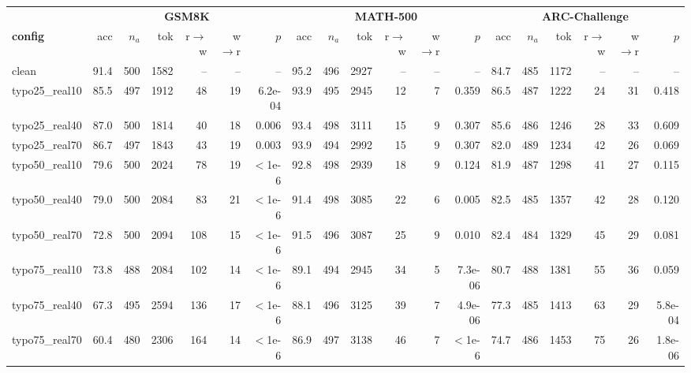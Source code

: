 \begin{tabular}{l rrrrrr rrrrrr rrrrrr}
\toprule
& \multicolumn{6}{c}{\textbf{GSM8K}} & \multicolumn{6}{c}{\textbf{MATH-500}} & \multicolumn{6}{c}{\textbf{ARC-Challenge}} \\
\cmidrule(lr){2-7}\cmidrule(lr){8-13}\cmidrule(lr){14-19}
\textbf{config} & acc & $n_a$ & tok & r$\to$w & w$\to$r & $p$ & acc & $n_a$ & tok & r$\to$w & w$\to$r & $p$ & acc & $n_a$ & tok & r$\to$w & w$\to$r & $p$ \\
\midrule
clean & 91.4 & 500 & 1582 & -- & -- & -- & 95.2 & 496 & 2927 & -- & -- & -- & 84.7 & 485 & 1172 & -- & -- & -- \\
typo25\_real10 & 85.5 & 497 & 1912 & 48 & 19 & 6.2e-04 & 93.9 & 495 & 2945 & 12 & 7 & 0.359 & 86.5 & 487 & 1222 & 24 & 31 & 0.418 \\
typo25\_real40 & 87.0 & 500 & 1814 & 40 & 18 & 0.006 & 93.4 & 498 & 3111 & 15 & 9 & 0.307 & 85.6 & 486 & 1246 & 28 & 33 & 0.609 \\
typo25\_real70 & 86.7 & 497 & 1843 & 43 & 19 & 0.003 & 93.9 & 494 & 2992 & 15 & 9 & 0.307 & 82.0 & 489 & 1234 & 42 & 26 & 0.069 \\
typo50\_real10 & 79.6 & 500 & 2024 & 78 & 19 & $<$1e-6 & 92.8 & 498 & 2939 & 18 & 9 & 0.124 & 81.9 & 487 & 1298 & 41 & 27 & 0.115 \\
typo50\_real40 & 79.0 & 500 & 2084 & 83 & 21 & $<$1e-6 & 91.4 & 498 & 3085 & 22 & 6 & 0.005 & 82.5 & 485 & 1357 & 42 & 28 & 0.120 \\
typo50\_real70 & 72.8 & 500 & 2094 & 108 & 15 & $<$1e-6 & 91.5 & 496 & 3087 & 25 & 9 & 0.010 & 82.4 & 484 & 1329 & 45 & 29 & 0.081 \\
typo75\_real10 & 73.8 & 488 & 2084 & 102 & 14 & $<$1e-6 & 89.1 & 494 & 2945 & 34 & 5 & 7.3e-06 & 80.7 & 488 & 1381 & 55 & 36 & 0.059 \\
typo75\_real40 & 67.3 & 495 & 2594 & 136 & 17 & $<$1e-6 & 88.1 & 496 & 3125 & 39 & 7 & 4.9e-06 & 77.3 & 485 & 1413 & 63 & 29 & 5.8e-04 \\
typo75\_real70 & 60.4 & 480 & 2306 & 164 & 14 & $<$1e-6 & 86.9 & 497 & 3138 & 46 & 7 & $<$1e-6 & 74.7 & 486 & 1453 & 75 & 26 & 1.8e-06 \\
\bottomrule
\end{tabular}